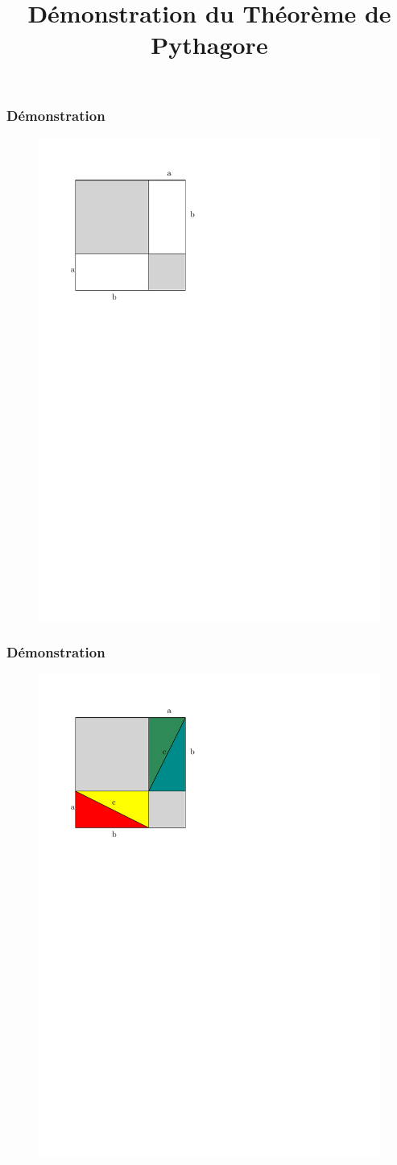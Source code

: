 \documentclass{beamer}
\title{Démonstration du Théorème de Pythagore}
\begin{document}
\frame{\titlepage}

\begin{frame}
  \frametitle{Démonstration}
 	\begin{figure}[H]
	  \centering
	  \includegraphics[width=0.65\linewidth]{sources/1/demo-pytha-t0.pdf}
	\end{figure}
\end{frame}

\begin{frame}
  \frametitle{Démonstration}
 	\begin{figure}[H]
	  \centering
	  \includegraphics[width=0.65\linewidth]{sources/1/demo-pytha-t1.pdf}
	\end{figure}
\end{frame}
\end{document}
